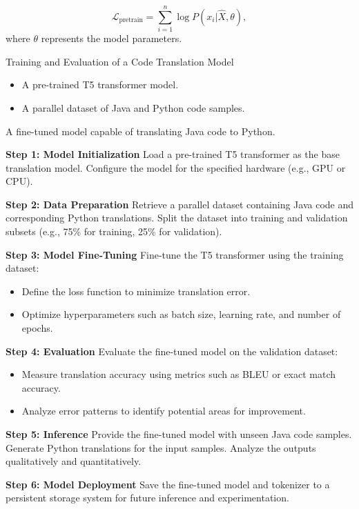 \documentclass{dhbenelux}
\begin{document}
\begin{equation}
\mathcal{L}_{\text{pretrain}} = \sum_{i=1}^n \log P(x_i | \hat{X}, \theta),
\label{eq:pretrain-objective}
\end{equation}
where \( \theta \) represents the model parameters.


\begin{algorithm}
\caption{Training and Evaluation of a Code Translation Model}
\label{alg:code_translation}
\begin{algorithmic}[1]
\Require 
\begin{itemize}
    \item A pre-trained T5 transformer model.
    \item A parallel dataset of Java and Python code samples.
\end{itemize}
\Ensure A fine-tuned model capable of translating Java code to Python.

\State \textbf{Step 1: Model Initialization}
\State Load a pre-trained T5 transformer as the base translation model.
\State Configure the model for the specified hardware (e.g., GPU or CPU).

\State \textbf{Step 2: Data Preparation}
\State Retrieve a parallel dataset containing Java code and corresponding Python translations.
\State Split the dataset into training and validation subsets (e.g., 75\% for training, 25\% for validation).

\State \textbf{Step 3: Model Fine-Tuning}
\State Fine-tune the T5 transformer using the training dataset:
\begin{itemize}
    \item Define the loss function to minimize translation error.
    \item Optimize hyperparameters such as batch size, learning rate, and number of epochs.
\end{itemize}

\State \textbf{Step 4: Evaluation}
\State Evaluate the fine-tuned model on the validation dataset:
\begin{itemize}
    \item Measure translation accuracy using metrics such as BLEU or exact match accuracy.
    \item Analyze error patterns to identify potential areas for improvement.
\end{itemize}

\State \textbf{Step 5: Inference}
\State Provide the fine-tuned model with unseen Java code samples.
\State Generate Python translations for the input samples.
\State Analyze the outputs qualitatively and quantitatively.

\State \textbf{Step 6: Model Deployment}
\State Save the fine-tuned model and tokenizer to a persistent storage system for future inference and experimentation.

\end{algorithmic}
\end{algorithm}
\end{document}
